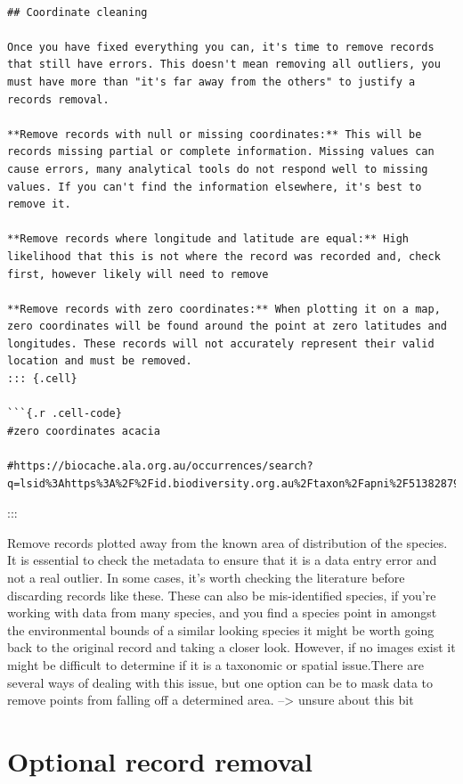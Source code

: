 \documentclass[
  letterpaper,
  DIV=11,
  numbers=noendperiod,
  oneside]{scrreprt}
\begin{document}
\begin{verbatim}

## Coordinate cleaning

Once you have fixed everything you can, it's time to remove records that still have errors. This doesn't mean removing all outliers, you must have more than "it's far away from the others" to justify a records removal.

**Remove records with null or missing coordinates:** This will be records missing partial or complete information. Missing values can cause errors, many analytical tools do not respond well to missing values. If you can't find the information elsewhere, it's best to remove it.

**Remove records where longitude and latitude are equal:** High likelihood that this is not where the record was recorded and, check first, however likely will need to remove

**Remove records with zero coordinates:** When plotting it on a map, zero coordinates will be found around the point at zero latitudes and longitudes. These records will not accurately represent their valid location and must be removed.
::: {.cell}

```{.r .cell-code}
#zero coordinates acacia 

#https://biocache.ala.org.au/occurrences/search?q=lsid%3Ahttps%3A%2F%2Fid.biodiversity.org.au%2Ftaxon%2Fapni%2F51382879&disableAllQualityFilters=true&qualityProfile=ALA&fq=spatiallyValid%3A%22false%22&radius=25&lat=-0.024032592068740033&lon=-0.06591796875#tab_recordsView 
\end{verbatim}

:::

Remove records plotted away from the known area of distribution of the
species. It is essential to check the metadata to ensure that it is a
data entry error and not a real outlier. In some cases, it's worth
checking the literature before discarding records like these. These can
also be mis-identified species, if you're working with data from many
species, and you find a species point in amongst the environmental
bounds of a similar looking species it might be worth going back to the
original record and taking a closer look. However, if no images exist it
might be difficult to determine if it is a taxonomic or spatial
issue.There are several ways of dealing with this issue, but one option
can be to mask data to remove points from falling off a determined area.
--\textgreater{} unsure about this bit

\hypertarget{optional-record-removal}{%
\section{Optional record removal}\label{optional-record-removal}}
\end{document}
